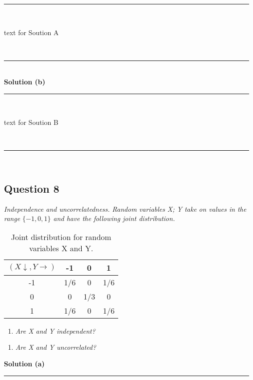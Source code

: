 \documentclass{article}
\begin{document}
\noindent\rule{\textwidth}{0.4pt}\\

\parbox{\textwidth}{text for Soution A}\\

\noindent\rule{\textwidth}{0.4pt}\\

\textbf{Solution (b)}

\noindent\rule{\textwidth}{0.4pt}\\

\parbox{\textwidth}{text for Soution B}\\

\noindent\rule{\textwidth}{0.4pt}\\

\newpage

\subsection*{Question 8}
\textit{Independence and uncorrelatedness. Random variables X; Y take on values in the range $\{-1,0,1\}$ and have the following joint distribution.}\\

\begin{table}[h]
\centering
\begin{tabular}{c|ccc}
$(X\downarrow ,Y \rightarrow)$ & -1 & 0 & 1 \\ \hline
-1 & 1/6 & 0 & 1/6 \\
0 & 0 & 1/3 & 0 \\
1 & 1/6 & 0 & 1/6 \\
\end{tabular}
\caption{Joint distribution for random variables X and Y.}
\label{tab:example_fractions}
\end{table}



\begin{enumerate}[label=(a)]
  \item \textit{Are X and Y independent?}
\end{enumerate}

\begin{enumerate}[label=(b)]
  \item \textit{Are X and Y uncorrelated?}
\end{enumerate}

\textbf{Solution (a)}

\noindent\rule{\textwidth}{0.4pt}\\
\end{document}
